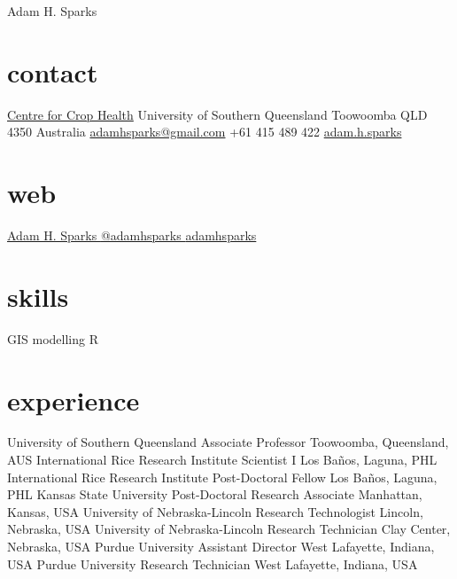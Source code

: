 
\hfill {\Huge Adam H. Sparks}

\begin{aside}
\small{\section{contact}
\href{http://www.usq.edu.au/research/research-at-usq/institutes-centres/cch}{Centre for Crop Health}
University of Southern Queensland
Toowoomba QLD 4350
Australia
\href{mailto:adamhsparks@gmail.com}{adamhsparks@gmail.com}
+61 415 489 422 \faMobilePhone{}
{\href{skype:adam.h.sparks?call}{adam.h.sparks }}
\section{web}
\href{https://ph.linkedin.com/pub/adam-sparks/8b/b96/507}{Adam H. Sparks {\color{linkedin}\FA {}}}
\href{https://www.twitter.com/adamhsparks/}{@adamhsparks {\color{twitter.blue}\FA {}}}
\href{https://github.com/adamhsparks/}{adamhsparks \FA {}}
\section{skills}
GIS
modelling
R
}
\end{aside}

\section*{experience}
\begin{entrylist}
    {University of Southern Queensland}
    {Associate Professor}
    {Toowoomba, Queensland, AUS}
    {International Rice Research Institute}
    {Scientist I}
    {Los Ba\~nos, Laguna, PHL}
    {International Rice Research Institute}
    {Post-Doctoral Fellow}
    {Los Ba\~nos, Laguna, PHL}
    {Kansas State University}
    {Post-Doctoral Research Associate}
    {Manhattan, Kansas, USA}
   {University of Nebraska-Lincoln}
   {Research Technologist}
   {Lincoln, Nebraska, USA}
   {University of Nebraska-Lincoln}
   {Research Technician}
   {Clay Center, Nebraska, USA}
   {Purdue University}
   {Assistant Director}
   {West Lafayette, Indiana, USA}
   {Purdue University}
   {Research Technician}
   {West Lafayette, Indiana, USA}

\end{entrylist}

